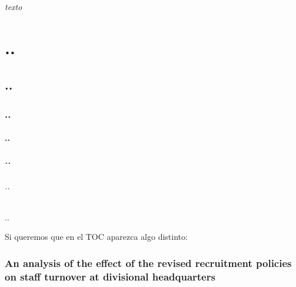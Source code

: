 \documentclass{article}
\begin{document}
\maketitle

\tableofcontents %

\emph{texto} %

\part{..} %
\chapter{..}
\section{..}
\subsection{..} %
\subsubsection{..} %
\paragraph{..} %
\subparagraph{..} %

Si queremos que en el TOC aparezca algo distinto:
\section[Effect on staff turnover]{An analysis of the effect of the revised recruitment policies on staff turnover at divisional headquarters}



\end{document}
